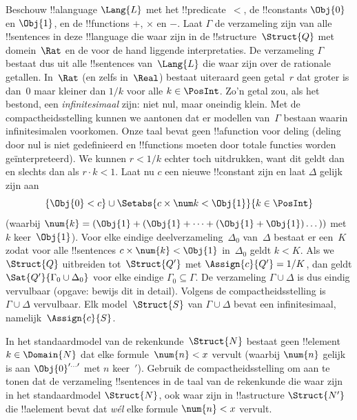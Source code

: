 \documentclass[../../../include/open-logic-section]{subfiles}
\begin{document}
{\begin{ex}
Beschouw !!a{language} $\Lang{L}$ met het !!{predicate}~$<$, de
!!{constant}s $\Obj{0}$ en $\Obj{1}$, en de !!{function}s $+$, $\times$
en $-$. Laat $\Gamma$ de verzameling zijn van alle !!{sentence}s in deze
!!{language} die waar zijn in de !!{structure}~$\Struct{Q}$ met
domein~$\Rat$ en de voor de hand liggende interpretaties. De verzameling
$\Gamma$ bestaat dus uit alle !!{sentence}s van~$\Lang{L}$ die waar zijn
over de rationale getallen. In~$\Rat$ (en zelfs in~$\Real$) bestaat
uiteraard geen getal~$r$ dat groter is dan~$0$ maar kleiner dan $1/k$
voor alle $k \in \PosInt$. Zo'n getal zou, als het bestond, een
\emph{infinitesimaal} zijn: niet nul, maar oneindig klein. Met de
compactheidsstelling kunnen we aantonen dat er modellen van~$\Gamma$
bestaan waarin infinitesimalen voorkomen. Onze taal bevat geen
!!a{function} voor deling (deling door nul is niet gedefinieerd en
!!{function}s moeten door totale functies worden geïnterpreteerd). We
kunnen $r < 1/k$ echter toch uitdrukken, want dit geldt dan en slechts
dan als $r \cdot k < 1$. Laat nu $c$ een nieuwe !!{constant} zijn en
laat $\Delta$ gelijk zijn aan
\[
\{\Obj{0} < c\}
\cup \Setabs{ c \times \num k < \Obj{1} }{k \in \PosInt}
\]
(waarbij $\num{k} = (\Obj{1} + (\Obj{1} + \dots + (\Obj{1} +
\Obj{1})\dots))$ met $k$ keer~$\Obj{1}$). Voor elke eindige
deelverzameling~$\Delta_0$ van~$\Delta$ bestaat er een~$K$ zodat voor
alle !!{sentence}s $c \times \num{k} < \Obj{1}$ in~$\Delta_0$ geldt
$k < K$. Als we $\Struct{Q}$ uitbreiden tot~$\Struct{Q'}$ met
$\Assign{c}{Q'} = 1/K$, dan geldt $\Sat{Q'}{\Gamma_0 \cup \Delta_0}$
voor elke eindige $\Gamma_0 \subseteq \Gamma$. De verzameling
$\Gamma \cup \Delta$ is dus eindig vervulbaar (opgave: bewijs dit in
detail). Volgens de compactheidsstelling is $\Gamma \cup \Delta$
vervulbaar. Elk model~$\Struct{S}$ van $\Gamma \cup \Delta$ bevat een
infinitesimaal, namelijk~$\Assign{c}{S}$.
\end{ex}
}{}

\begin{prob}
In het standaardmodel van de rekenkunde~$\Struct{N}$ bestaat geen
!!{element}~$k \in \Domain{N}$ dat elke formule~$\num{n} < x$ vervult
(waarbij $\num{n}$ gelijk is aan $\Obj{0}^{\prime\dots\prime}$ met $n$
keer~$\prime$). Gebruik de compactheidsstelling om aan te tonen dat de
verzameling !!{sentence}s in de taal van de rekenkunde die waar zijn in
het standaardmodel $\Struct{N}$, ook waar zijn in !!a{structure}
$\Struct{N'}$ die !!a{element} bevat dat \emph{wél} elke formule
$\num{n} < x$ vervult.
\end{prob}
\tagendprob
\end{document}
